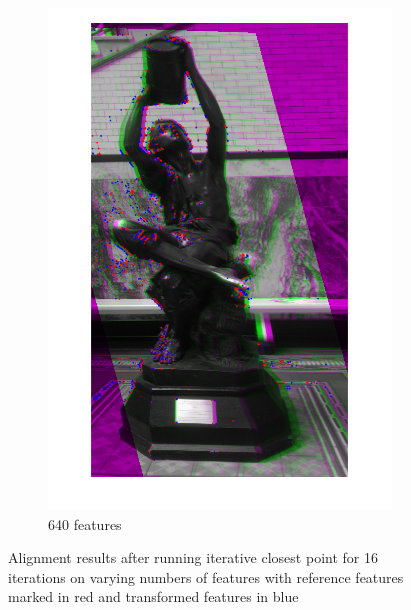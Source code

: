 \documentclass{article}
\begin{document}
\begin{figure}[h]
\begin{subfigure}[b]{0.3\textwidth}
    	\includegraphics[width=\textwidth]{figures/alignment/fused_640_features_16_iterations}
    	\caption{640 features}
    \end{subfigure}
	\caption{Alignment results after running iterative closest point for 16 iterations on varying numbers of features with reference features marked in red and transformed features in blue}
	\label{fig_alignment_results}
\end{figure}
\end{document}
